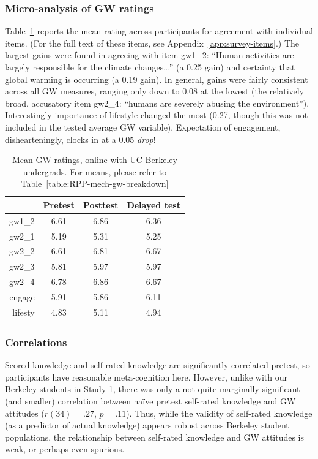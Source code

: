 \subsubsection{Micro-analysis of GW ratings}

Table~\ref{table:uc-online-gw-means} reports the mean rating across participants
for agreement with individual items. (For the full text of these items, see
Appendix~\ref{app:survey-items}.) The largest gains were found in agreeing with
item \textsf{gw1_2}: ``Human activities are largely responsible for the climate
changes\ldots'' (a 0.25 gain) and certainty that global warming is occurring (a
0.19 gain).  In general, gains were fairly consistent across all GW measures,
ranging only down to 0.08 at the lowest (the relatively broad, accusatory item
\textsf{gw2_4}: “humans are severely abusing the environment”). Interestingly
importance of lifestyle changed the most (0.27, though this was not included in
the tested average GW variable).  Expectation of engagement, dishearteningly,
clocks in at a 0.05 \emph{drop}! 

\begin{table}
\caption{Mean GW ratings, online with UC Berkeley undergrads. For means, please refer to
         Table~\ref{table:RPP-mech-gw-breakdown}} 
\label{table:uc-online-gw-means}
\centering
\begin{tabular}{>{\sffamily}rccc}
  \toprule
 & Pretest & Posttest & Delayed test \\ 
  \midrule
  gw1_2 & 6.61 & 6.86 & 6.36 \\ 
  gw2_1 & 5.19 & 5.31 & 5.25 \\ 
  gw2_2 & 6.61 & 6.81 & 6.67 \\ 
  gw2_3 & 5.81 & 5.97 & 5.97 \\ 
  gw2_4 & 6.78 & 6.86 & 6.67 \\ 
  engage & 5.91 & 5.86 & 6.11 \\ 
  lifesty & 4.83 & 5.11 & 4.94 \\ 
  \bottomrule
\end{tabular}
\end{table}

\subsubsection{Correlations}

Scored knowledge and self-rated knowledge are significantly correlated pretest,
so participants have reasonable meta-cognition here. However, unlike with our
Berkeley students in Study 1, there was only a not quite marginally significant
(and smaller) correlation between na\"ive pretest self-rated knowledge and GW
attitudes ($r(34)=.27$, $p=.11$). Thus, while the validity of self-rated
knowledge (as a predictor of actual knowledge) appears robust across Berkeley
student populations, the relationship between self-rated knowledge and GW
attitudes is weak, or perhaps even spurious.

